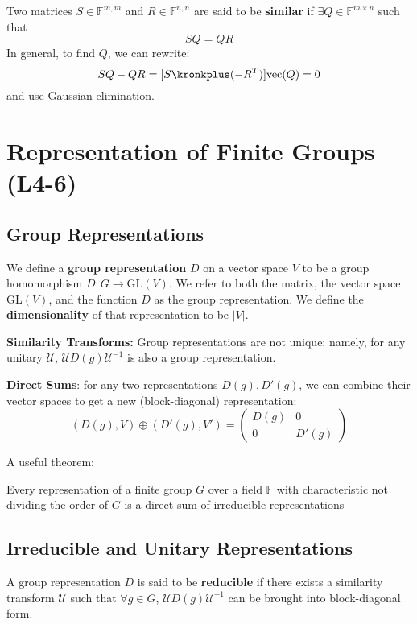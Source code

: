 \documentclass[9pt]{article}
\begin{document}
\begin{multicols}{2}
Two matrices $S \in \mathbb{F}^{m, m}$ and $R\in \mathbb{F}^{n, n}$ are said to be \textbf{similar} if $\exists Q \in \mathbb{F}^{m \times n}$ such that
$$SQ=QR$$
In general, to find $Q$, we can rewrite:
\begin{equation}
    SQ-QR=[S \kronkplus (-R^{T})]\text{vec}(Q)=0
\end{equation}
and use Gaussian elimination.

\section{Representation of Finite Groups (L4-6)}

\subsection{Group Representations}
We define a \textbf{group representation} $D$ on a vector space
$V$ to be a group homomorphism $D: G \to \text{GL}(V)$. We refer
to both the matrix, the vector space $\text{GL}(V)$, and the function $D$ as the group
representation. We define the \textbf{dimensionality} of that representation 
to be $|V|$.

\textbf{Similarity Transforms:} Group representations are not unique: namely, for any unitary $\mathcal{U}$, $\mathcal{U}D(g)\mathcal{U}^{-1}$ is also a group representation. 

\textbf{Direct Sums}: for any two representations $D(g), D'(g)$, 
we can combine their vector spaces to get a new (block-diagonal) representation:
$$(D(g),V) \oplus (D'(g),V') = \begin{pmatrix} D(g) & 0 \\ 0 & D'(g) \end{pmatrix}$$

A useful theorem:

\begin{theorem}
     Every representation of a finite group $G$ over a field 
 $\mathbb{F}$ with characteristic not dividing the order of 
$G$ is a direct sum of irreducible representations
\end{theorem}
\subsection{Irreducible and Unitary Representations}

A group representation $D$ is said to be \textbf{reducible} if there exists
a similarity transform $\mathcal{U}$ such that $\forall g \in G$, $\mathcal{U}D(g)\mathcal{U}^{-1}$ can be brought into block-diagonal form.


\end{multicols}
\end{document}
